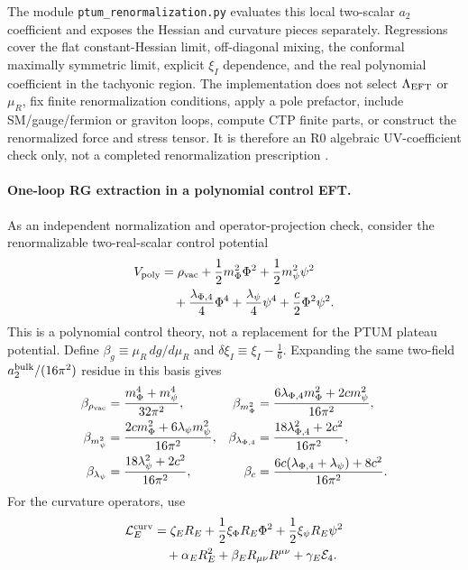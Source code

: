 \documentclass[epj]{svjour}
\begin{document}
The module \texttt{ptum\_renormalization.py} evaluates this local
two-scalar $a_2$ coefficient and exposes the Hessian and curvature
pieces separately. Regressions cover the flat constant-Hessian limit,
off-diagonal mixing, the conformal maximally symmetric limit, explicit
$\xi_I$ dependence, and the real polynomial coefficient in the
tachyonic region. The implementation does not select
$\Lambda_{\rm EFT}$ or $\mu_R$, fix finite renormalization conditions,
apply a pole prefactor, include SM/gauge/fermion or graviton loops,
compute CTP finite parts, or construct the renormalized force and stress
tensor. It is therefore an R0 algebraic UV-coefficient check only,
not a completed renormalization prescription
\cite{Vassilevich2003,MarkkanenTranberg2013}.




\paragraph{One-loop RG extraction in a polynomial control EFT.}
As an independent normalization and operator-projection check, consider
the renormalizable two-real-scalar control potential
\begin{equation}
\begin{aligned}
V_{\rm poly}
&=\rho_{\rm vac}
+\frac12m_\Phi^2\Phi^2
+\frac12m_\psi^2\psi^2\\
&\quad+\frac{\lambda_{\Phi,4}}4\Phi^4
+\frac{\lambda_\psi}4\psi^4
+\frac c2\Phi^2\psi^2 .
\end{aligned}
\end{equation}
This is a polynomial control theory, not a replacement for the PTUM
plateau potential. Define
$\beta_g\equiv\mu_R\,dg/d\mu_R$ and
$\delta\xi_I\equiv\xi_I-\tfrac16$. Expanding the same two-field
$a_2^{\rm bulk}/(16\pi^2)$ residue in this basis gives
\begin{align}
\beta_{\rho_{\rm vac}}
&=\frac{m_\Phi^4+m_\psi^4}{32\pi^2},
&
\beta_{m_\Phi^2}
&=\frac{6\lambda_{\Phi,4}m_\Phi^2+2cm_\psi^2}{16\pi^2},
\nonumber\\
\beta_{m_\psi^2}
&=\frac{2cm_\Phi^2+6\lambda_\psi m_\psi^2}{16\pi^2},
&
\beta_{\lambda_{\Phi,4}}
&=\frac{18\lambda_{\Phi,4}^2+2c^2}{16\pi^2},
\nonumber\\
\beta_{\lambda_\psi}
&=\frac{18\lambda_\psi^2+2c^2}{16\pi^2},
&
\beta_c
&=\frac{6c(\lambda_{\Phi,4}+\lambda_\psi)+8c^2}{16\pi^2}.
\label{eq:ptum_scalar_quartic_beta_potential}
\end{align}
For the curvature operators, use
\begin{equation}
\begin{aligned}
\mathcal L_E^{\rm curv}
&=\zeta_E R_E
+\frac12\xi_\Phi R_E\Phi^2
+\frac12\xi_\psi R_E\psi^2\\
&\quad+\alpha_E R_E^2
+\beta_E R_{\mu\nu}R^{\mu\nu}
+\gamma_E\mathcal E_4 .
\end{aligned}
\end{equation}
\end{document}

